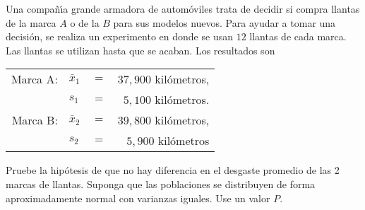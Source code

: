 \begin{enunciado}
 Una compa\~n\'{\i}a grande armadora de autom\'oviles trata de decidir si compra llantas de la marca $A$ o de la $B$ para sus modelos nuevos. Para ayudar a tomar una decisi\'on, se realiza un experimento en donde se usan $12$ llantas de cada marca. Las llantas se utilizan hasta que se acaban. Los resultados son
 \begin{center}
  \begin{tabular}{rlcr}
   Marca A: & $\bar{x}_1$ & $=$ & $37,900$ kil\'ometros, \\
   & $s_1$ & $=$ & $5,100$ kil\'ometros. \\
   Marca B: & $\bar{x}_2$ & $=$ & $39,800$ kil\'ometros, \\
   & $s_2$ & $=$ & $5,900$ kil\'ometros
  \end{tabular}
 \end{center}
 Pruebe la hip\'otesis de que no hay diferencia en el desgaste promedio de las 2 marcas de llantas. Suponga que las poblaciones se distribuyen de forma aproximadamente normal con varianzas iguales. Use un valor $P$.
\end{enunciado}

